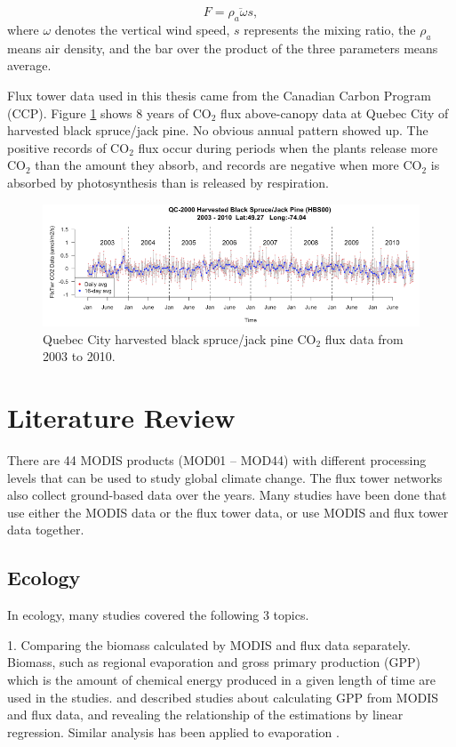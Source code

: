 \documentclass{article}
\begin{document}
\begin{equation}
F = \overline{\rho_a\omega s},
\end{equation}
where $\omega$ denotes the vertical wind speed, $s$ represents the mixing ratio, the $\rho_a$ means air density, and the bar over the product of the three parameters means average.  

Flux tower data used in this thesis came from the Canadian Carbon Program (CCP).
Figure \ref{Fig:QCmodis} shows 8 years of CO$_2$ flux above-canopy data at Quebec City of harvested black spruce/jack pine. No obvious annual pattern showed up. The positive records of CO$_2$ flux occur during periods when the plants release more CO$_2$ than the amount they absorb, and records are negative when more CO$_2$ is absorbed by photosynthesis than is released by respiration.

\begin{figure}[!ht]
\centering
\includegraphics[width=14cm]{QCmodis1.png}
\caption{Quebec City harvested black spruce/jack pine CO$_2$ flux data from 2003 to 2010.}
\label{Fig:QCmodis}
\end{figure}

\section{Literature Review}\label{Sec:LiteratureReview}

There are 44 MODIS products (MOD01 -- MOD44) with different processing levels that can be used to study global climate change.
The flux tower networks also collect ground-based data over the years. 
Many studies have been done that use either the MODIS data or the flux tower data, or use MODIS and flux tower data together. 
\subsection{Ecology}

In ecology, many studies covered the following 3 topics.

1. Comparing the biomass calculated by MODIS and flux data separately. Biomass, such as regional evaporation and gross primary production (GPP) which is the amount of chemical energy produced in a given length of time are used in the studies. \citet{heinsch2006evaluation} and \citet{kalfas2011modeling} described studies about calculating GPP from MODIS and flux data, and revealing the relationship of the estimations by linear regression. Similar analysis has been applied to evaporation \citep{cleugh2007regional}.
\end{document}
